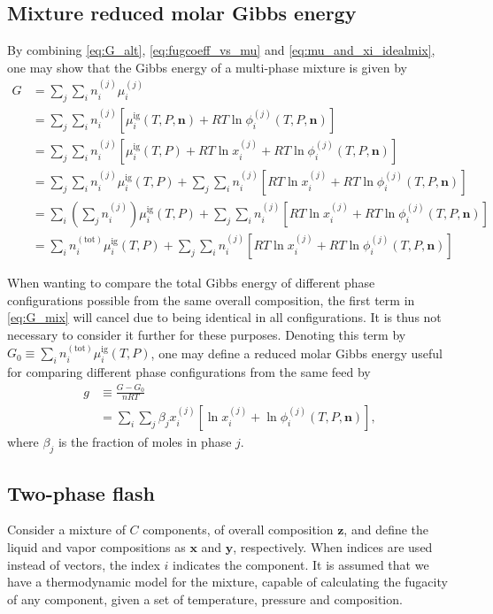 \documentclass[english]{../thermomemo/thermomemo}
\newcommand*{\vektor}[1]{\boldsymbol{#1}}%
\begin{document}
\subsection{Mixture reduced molar Gibbs energy}
By combining \eqref{eq:G_alt}, \eqref{eq:fugcoeff_vs_mu} and \eqref{eq:mu_and_xi_idealmix}, one may show that 
the Gibbs energy of a multi-phase mixture is given by 
\begin{align}
  G &= \sum_j \sum_i n_i^{(j)} \mu_i^{(j)} \nonumber\\
  &= \sum_j\sum_i n_i^{(j)} \left[ \mu_i^\text{ig}(T,P,\vektor{n}) + RT\ln \phi_i^{(j)}(T,P,\vektor{n})\right] \nonumber\\
  &= \sum_j\sum_i n_i^{(j)} \left[ \mu_i^\text{ig}(T,P) + RT\ln x_i^{(j)} + RT\ln \phi_i^{(j)}(T,P,\vektor{n})\right] \nonumber\\
  &= \sum_j\sum_i n_i^{(j)} \mu_i^\text{ig}(T,P) +  \sum_j \sum_i n_i^{(j)} \left[ RT\ln x_i^{(j)} + RT\ln \phi_i^{(j)}(T,P,\vektor{n})\right] \nonumber\\
  &= \sum_i \left( \sum_j n_i^{(j)} \right) \mu_i^\text{ig}(T,P) +  
      \sum_j \sum_i n_i^{(j)} \left[ RT\ln x_i^{(j)} + RT\ln \phi_i^{(j)}(T,P,\vektor{n})\right] \nonumber\\
  &= \sum_i  n_i^{(\text{tot})}  \mu_i^\text{ig}(T,P) +  
      \sum_j \sum_i n_i^{(j)} \left[ RT\ln x_i^{(j)} + RT\ln \phi_i^{(j)}(T,P,\vektor{n})\right] 
  \label{eq:G_mix}
\end{align}

When wanting to compare the total Gibbs energy of different phase configurations possible from the same overall composition, 
the first term in \eqref{eq:G_mix} will cancel due to being identical in all configurations. It is thus not necessary to consider 
it further for these purposes. Denoting this term by $G_0 \equiv \sum_i  n_i^{(\text{tot})}  \mu_i^\text{ig}(T,P)$, one may 
define a reduced molar Gibbs energy useful for comparing different phase configurations from the same feed by 
\begin{align}
  g &\equiv \frac{G - G_0 }{nRT} \nonumber\\
    &= \sum_i \sum_j \beta_j  x_i^{(j)} \left[ \ln x_i^{(j)} + \ln \phi_i^{(j)}(T,P,\vektor{n})\right],
  \label{eq:g_func}
\end{align}
where $\beta_j$ is the fraction of moles in phase $j$.


\subsection{Two-phase flash}
Consider a mixture of $C$ components, of overall composition $\vektor{z}$, and define the liquid and vapor compositions as 
$\vektor{x}$ and $\vektor{y}$, respectively. When indices are used instead of vectors, the index $i$ indicates the component.
It is assumed that we have a thermodynamic model for the mixture, capable of calculating the fugacity of any component, given a set of   
temperature, pressure and composition.
\end{document}
